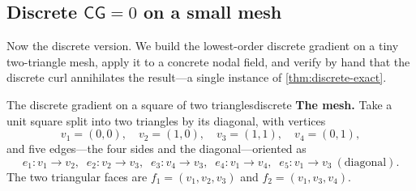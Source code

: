 \subsection{Discrete $\mathsf{C}\mathsf{G}=0$ on a small mesh}

Now the discrete version. We build the lowest-order discrete gradient on a tiny
two-triangle mesh, apply it to a concrete nodal field, and verify by hand that the
discrete curl annihilates the result---a single instance of
\cref{thm:discrete-exact}.

\begin{workedexample}{The discrete gradient on a square of two triangles}{discrete}
\textbf{The mesh.} Take a unit square split into two triangles by its diagonal, with
vertices
\[
  v_1=(0,0),\quad v_2=(1,0),\quad v_3=(1,1),\quad v_4=(0,1),
\]
and five edges---the four sides and the diagonal---oriented as
\[
  e_1: v_1\!\to\!v_2,\;\;
  e_2: v_2\!\to\!v_3,\;\;
  e_3: v_4\!\to\!v_3,\;\;
  e_4: v_1\!\to\!v_4,\;\;
  e_5: v_1\!\to\!v_3 \ (\text{diagonal}).
\]
The two triangular faces are
$f_1=(v_1,v_2,v_3)$ and $f_2=(v_1,v_3,v_4)$.


\end{workedexample}
